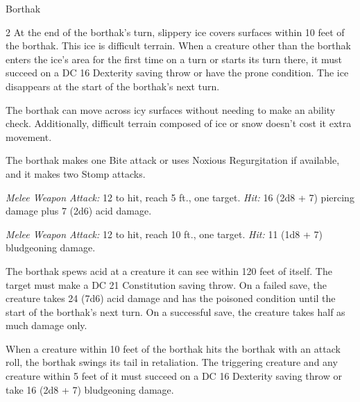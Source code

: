 \documentclass[10pt,a4paper,twoside,bg=print,twocolumn,openany,nodeprecatedcode]{dndbook}
\begin{document}
\begin{DndMonster}[float*=b,width=\textwidth + 8pt]{Borthak}
\begin{multicols}{2}
\DndMonsterBasics[
armor-class = {16 (natural armor)},
hit-points = {\DndDice{16d12 + 96}},
speed = {30 ft.}
]
\DndMonsterAbilityScores[
 str = 25,
 dex = 16,
 con = 22,
 int = 4,
 wis = 14,
 cha = 15
]
\DndMonsterDetails[
saving-throws = {Str +12, Con +11, Cha +7},
damage-resistances = {acid, cold},
senses = {darkvision 60 ft., passive perception 12},
challenge = 15,
]
At the end of the borthak's turn, slippery ice covers surfaces within 10 feet of the borthak. This ice is difficult terrain. When a creature other than the borthak enters the ice's area for the first time on a turn or starts its turn there, it must succeed on a DC 16 Dexterity saving throw or have the prone condition. The ice disappears at the start of the borthak's next turn.

The borthak can move across icy surfaces without needing to make an ability check. Additionally, difficult terrain composed of ice or snow doesn't cost it extra movement.

The borthak makes one Bite attack or uses Noxious Regurgitation if available, and it makes two Stomp attacks.

\textsl{Melee Weapon Attack:} 12 to hit, reach 5 ft., one target. \textsl{Hit:} 16 (2d8 + 7) piercing damage plus 7 (2d6) acid damage.

\textsl{Melee Weapon Attack:} 12 to hit, reach 10 ft., one target. \textsl{Hit:} 11 (1d8 + 7) bludgeoning damage.

The borthak spews acid at a creature it can see within 120 feet of itself. The target must make a DC 21 Constitution saving throw. On a failed save, the creature takes 24 (7d6) acid damage and has the poisoned condition until the start of the borthak's next turn. On a successful save, the creature takes half as much damage only.

When a creature within 10 feet of the borthak hits the borthak with an attack roll, the borthak swings its tail in retaliation. The triggering creature and any creature within 5 feet of it must succeed on a DC 16 Dexterity saving throw or take 16 (2d8 + 7) bludgeoning damage.


\end{multicols}
\end{DndMonster}
\end{document}
